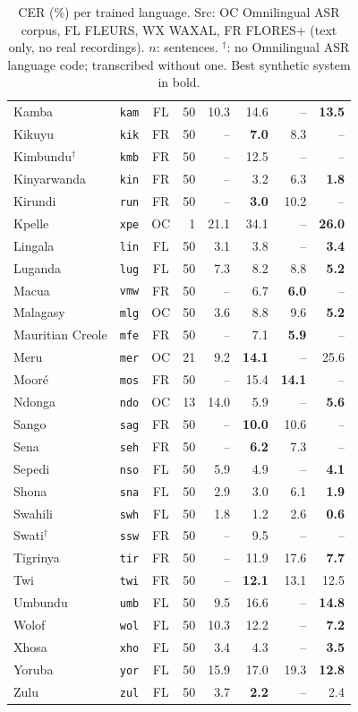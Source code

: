 \begin{table}[h!]
\begin{tabular}{llcrrrrr}
Kamba & \texttt{kam} & FL & 50 & 10.3 & 14.6 & -- & \textbf{13.5} \\
Kikuyu & \texttt{kik} & FR & 50 & -- & \textbf{7.0} & 8.3 & -- \\
Kimbundu$^\dagger$ & \texttt{kmb} & FR & 50 & -- & 12.5 & -- & -- \\
Kinyarwanda & \texttt{kin} & FR & 50 & -- & 3.2 & 6.3 & \textbf{1.8} \\
Kirundi & \texttt{run} & FR & 50 & -- & \textbf{3.0} & 10.2 & -- \\
Kpelle & \texttt{xpe} & OC & 1 & 21.1 & 34.1 & -- & \textbf{26.0} \\
Lingala & \texttt{lin} & FL & 50 & 3.1 & 3.8 & -- & \textbf{3.4} \\
Luganda & \texttt{lug} & FL & 50 & 7.3 & 8.2 & 8.8 & \textbf{5.2} \\
Macua & \texttt{vmw} & FR & 50 & -- & 6.7 & \textbf{6.0} & -- \\
Malagasy & \texttt{mlg} & OC & 50 & 3.6 & 8.8 & 9.6 & \textbf{5.2} \\
Mauritian Creole & \texttt{mfe} & FR & 50 & -- & 7.1 & \textbf{5.9} & -- \\
Meru & \texttt{mer} & OC & 21 & 9.2 & \textbf{14.1} & -- & 25.6 \\
Mooré & \texttt{mos} & FR & 50 & -- & 15.4 & \textbf{14.1} & -- \\
Ndonga & \texttt{ndo} & OC & 13 & 14.0 & 5.9 & -- & \textbf{5.6} \\
Sango & \texttt{sag} & FR & 50 & -- & \textbf{10.0} & 10.6 & -- \\
Sena & \texttt{seh} & FR & 50 & -- & \textbf{6.2} & 7.3 & -- \\
Sepedi & \texttt{nso} & FL & 50 & 5.9 & 4.9 & -- & \textbf{4.1} \\
Shona & \texttt{sna} & FL & 50 & 2.9 & 3.0 & 6.1 & \textbf{1.9} \\
Swahili & \texttt{swh} & FL & 50 & 1.8 & 1.2 & 2.6 & \textbf{0.6} \\
Swati$^\dagger$ & \texttt{ssw} & FR & 50 & -- & 9.5 & -- & -- \\
Tigrinya & \texttt{tir} & FR & 50 & -- & 11.9 & 17.6 & \textbf{7.7} \\
Twi & \texttt{twi} & FR & 50 & -- & \textbf{12.1} & 13.1 & 12.5 \\
Umbundu & \texttt{umb} & FL & 50 & 9.5 & 16.6 & -- & \textbf{14.8} \\
Wolof & \texttt{wol} & FL & 50 & 10.3 & 12.2 & -- & \textbf{7.2} \\
Xhosa & \texttt{xho} & FL & 50 & 3.4 & 4.3 & -- & \textbf{3.5} \\
Yoruba & \texttt{yor} & FL & 50 & 15.9 & 17.0 & 19.3 & \textbf{12.8} \\
Zulu & \texttt{zul} & FL & 50 & 3.7 & \textbf{2.2} & -- & 2.4 \\
\bottomrule
\end{tabular}
\caption{CER (\%) per trained language. Src: OC Omnilingual ASR corpus, FL FLEURS, WX WAXAL, FR FLORES+ (text only, no real recordings). $n$: sentences. $^\dagger$: no Omnilingual ASR language code; transcribed without one. Best synthetic system in bold.}
\label{tab:perlang}
\end{table}
